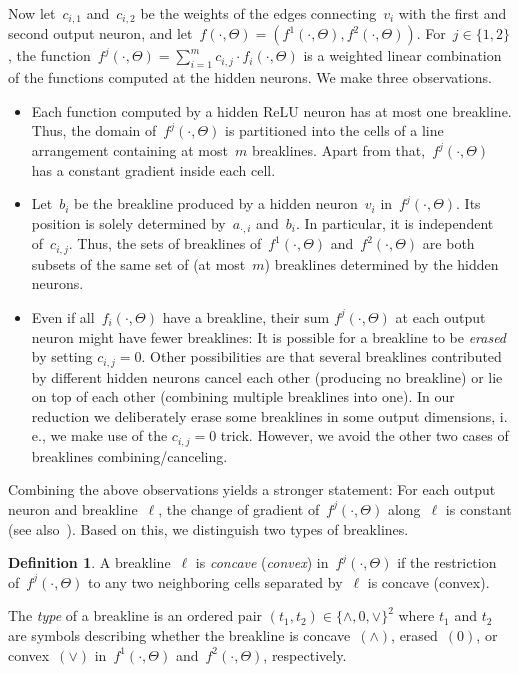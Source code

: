 \documentclass[11pt]{article}
\numberwithin{equation}{section}
\theoremstyle{definition}
\newtheorem{definition}[theorem]{Definition}
\theoremstyle{plain}
\newcommand{\ie}{i.\,e.}
\newcommand{\ReLU}{\ensuremath{\mathrm{ReLU}}\xspace}
\theoremstyle{plain}
\begin{document}
Now let~$c_{i,1}$ and~$c_{i,2}$ be the weights of the edges connecting~$v_i$ with the first and second output neuron, and let~$f(\cdot, \Theta) = (f^1(\cdot, \Theta), f^2(\cdot, \Theta))$.
For~$j \in \{1,2\}$, the function~$f^j(\cdot, \Theta) = \sum_{i = 1}^m c_{i,j} \cdot f_i(\cdot, \Theta)$ is a weighted linear combination of the functions computed at the hidden neurons.
We make three observations.

\begin{itemize}
    \item Each function computed by a hidden \ReLU neuron has at most one breakline.
    Thus, the domain of~$f^j(\cdot, \Theta)$ is partitioned into the cells of a line arrangement containing at most~$m$ breaklines.
    Apart from that,~$f^j(\cdot, \Theta)$ has a constant gradient inside each cell.

    \item Let~$b_i$ be the breakline produced by a hidden neuron~$v_i$ in~$f^j(\cdot, \Theta)$.
    Its position is solely determined by~$a_{\cdot,i}$ and~$b_i$.
    In particular, it is independent of~$c_{i,j}$.
    Thus, the sets of breaklines of~$f^1(\cdot, \Theta)$ and~$f^2(\cdot, \Theta)$ are both subsets of the same set of (at most~$m$) breaklines determined by the hidden neurons.

    \item Even if all~$f_i(\cdot, \Theta)$ have a breakline, their sum $f^j(\cdot, \Theta)$ at each output neuron might have fewer breaklines:
    It is possible for a breakline to be \emph{erased} by setting $c_{i,j} = 0$.
    Other possibilities are that several breaklines contributed by different hidden neurons cancel each other (producing no breakline) or lie on top of each other (combining multiple breaklines into one).
    In our reduction we deliberately erase some breaklines in some output dimensions, \ie, we make use of the $c_{i,j} = 0$ trick.
    However, we avoid the other two cases of breaklines combining/canceling.
\end{itemize}

Combining
the  %
above observations yields a stronger statement:
For each output neuron and breakline~$\ell$, the change of gradient of~$f^j(\cdot, \Theta)$ 
along~$\ell$ is constant (see also~\cite{Dereich2022_Minimal}).
Based on this, we distinguish two types of breaklines.

\begin{definition}
    A breakline~$\ell$ is \emph{concave} (\emph{convex}) in~$f^j(\cdot,\Theta)$ if the restriction of~$f^j(\cdot,\Theta)$ to any two neighboring cells separated by~$\ell$ is concave (convex).

    The \emph{type} of a breakline is %
an ordered pair  %
$(t_1,t_2) \in \{\wedge, 0, \vee\}^2$  
where $t_1$ and $t_2$ are symbols %
%
describing  whether the breakline is concave~$(\wedge)$, erased~$(0)$, 
or convex~$(\vee)$ in~$f^1(\cdot,\Theta)$ and~$f^2(\cdot,\Theta)$, respectively.
\end{definition}    %
\end{document}

